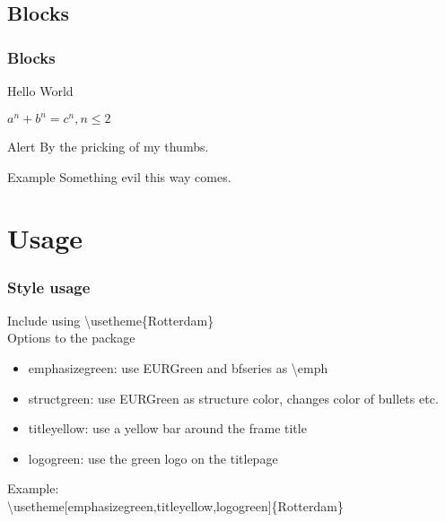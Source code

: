 \documentclass[t]{beamer}
\begin{document}
\subsection{Blocks}
\begin{frame}[t]
	\frametitle{Blocks}
	\begin{definition}[Greetings]
		Hello World
	\end{definition}

	\begin{theorem}
		$a^n + b^n = c^n, n \leq 2$
	\end{theorem}

	\begin{alertblock}{Alert}
		By the pricking of my thumbs.
	\end{alertblock}

	\begin{exampleblock}{Example}
		Something evil this way comes.
	\end{exampleblock}

\end{frame}

\section{Usage}
\begin{frame}
	\frametitle{Style usage}
	Include using \textbackslash usetheme\{Rotterdam\}\\
	Options to the package
	\begin{itemize}
		\item emphasizegreen: use {\color{EURGreen} EURGreen} and bfseries as \textbackslash emph
		\item structgreen: use {\color{EURGreen} EURGreen} as structure color, changes color of bullets etc.
		\item titleyellow: use a yellow bar around the frame title
		\item logogreen: use the green logo on the titlepage
	\end{itemize}
	Example:\\
	\textbackslash usetheme[emphasizegreen,titleyellow,logogreen]\{Rotterdam\}
\end{frame}
\end{document}
